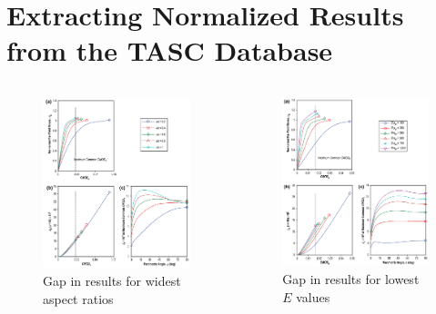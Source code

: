 \section{Extracting Normalized Results from the TASC Database}

\begin{frame}
\begin{columns}
\begin{column}{0.45\textwidth}
\begin{figure}[tbp]
\centering
\includegraphics[width=0.7\columnwidth]{aspect-ratio-gap}
\caption{\label{fig:aspect-ratio-gap} Gap in results for widest aspect ratios}
\end{figure}
\end{column}
\begin{column}{0.45\textwidth}
\begin{figure}[tbp]
\centering
\includegraphics[width=0.7\columnwidth]{modulus-gap}
\caption{Gap in results for lowest \(E\) values}
\end{figure}
\end{column}
\end{columns}
\end{frame}

